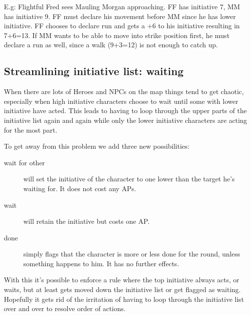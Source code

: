 E.g: Flightful Fred sees Mauling Morgan approaching. FF has initiative 7, MM has initiative 9. FF must declare his movement before MM since he has lower initiative. FF chooses to declare run and gets a +6 to his initiative resulting in 7+6=13. If MM wants to be able to move into strike position first, he must declare a run as well, since a walk (9+3=12) is not enough to catch up.




\subsection*{Streamlining initiative list: waiting}
When there are lots of Heroes and NPCs on the map things tend to get chaotic, especially when high initiative characters choose to wait until some with lower initiative have acted. This leads to having to loop through the upper parts of the initiative list again and again while only the lower initiative characters are acting for the most part.

To get away from this problem we add three new possibilities:\\
\begin{description}
\item[wait for other] will set the initiative of the character to one lower than the target he's waiting for. It does not cost any APs.
\item[wait] will retain the initiative but costs one AP.
\item[done] simply flags that the character is more or less done for the round, unless something happens to him. It has no further effects.
\end{description}

With this it's possible to enforce a rule where the top initiative always acts, or waits, but at least gets moved down the initiative list or get flagged as waiting. Hopefully it gets rid of the irritation of having to loop through the initiative list over and over to resolve order of actions.


